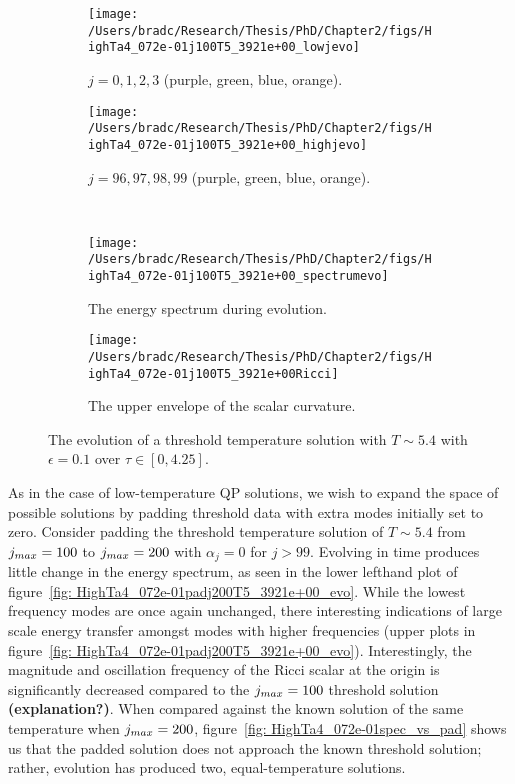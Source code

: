 \documentclass[../PhD.tex]{subfiles}
\begin{document}
\begin{figure}[h]
	\centering
	\begin{subfigure}[t]{0.48\textwidth}
		\texttt{[image: /Users/bradc/Research/Thesis/PhD/Chapter2/figs/HighTa4\_072e-01j100T5\_3921e+00\_lowjevo]}
		\caption{$j = 0, 1, 2, 3$ (purple, green, blue, orange).}
	\end{subfigure}
	\;
	\begin{subfigure}[t]{0.48\textwidth}
		\texttt{[image: /Users/bradc/Research/Thesis/PhD/Chapter2/figs/HighTa4\_072e-01j100T5\_3921e+00\_highjevo]}
		\caption{$j=96, 97, 98, 99$ (purple, green, blue, orange).}
		\label{fig: HighTa4_072e-01j100T5_3921e+00_highjevo}
	\end{subfigure}
	\\
	\begin{subfigure}[t]{0.48\textwidth}
		\texttt{[image: /Users/bradc/Research/Thesis/PhD/Chapter2/figs/HighTa4\_072e-01j100T5\_3921e+00\_spectrumevo]}
		\caption{The energy spectrum during evolution.}
		\label{fig: HighTa4_072e-01j100T5_3921e+00_spectrumevo}
	\end{subfigure}
	\quad
	\begin{subfigure}[t]{0.48\textwidth}
		\texttt{[image: /Users/bradc/Research/Thesis/PhD/Chapter2/figs/HighTa4\_072e-01j100T5\_3921e+00Ricci]}
		\caption{The upper envelope of the scalar curvature.}
		\label{fig: HighTa4_072e-01j100T5_3921e+00Ricci}
	\end{subfigure}
	\caption[Examining the energy per mode during the evolution of a threshold temperature solution]{The evolution of a threshold temperature solution with $T \sim 5.4$ with $\epsilon = 0.1$ over $\tau \in [0, 4.25]$.}
	\label{fig:HighTa4_072e-01j100T5_3921e+00_evo}
\end{figure}

As in the case of low-temperature QP solutions, we wish to expand the space of possible solutions by padding threshold data with extra modes initially set to zero. Consider padding the threshold temperature solution of $T \sim 5.4$ from $j_{max} = 100$ to $j_{max} = 200$ with $\alpha_j = 0$ for $j > 99$. Evolving in time produces little change in the energy spectrum, as seen in the lower lefthand plot of figure~\ref{fig: HighTa4_072e-01padj200T5_3921e+00_evo}. While the lowest frequency modes are once again unchanged, there interesting indications of large scale energy transfer amongst modes with higher frequencies (upper plots in figure~\ref{fig: HighTa4_072e-01padj200T5_3921e+00_evo}). Interestingly, the magnitude and oscillation frequency of the Ricci scalar at the origin is significantly decreased compared to the $j_{max} = 100$ threshold solution {\bf (explanation?)}. When compared against the known solution of the same temperature when $j_{max} = 200$, figure~\ref{fig: HighTa4_072e-01spec_vs_pad} shows us that the padded solution does not approach the known threshold solution; rather, evolution has produced two, equal-temperature solutions.
\end{document}
